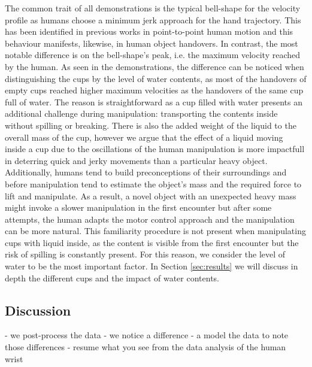 The common trait of all demonstrations is the typical bell-shape for the velocity profile as humans choose a minimum jerk approach for the hand trajectory. This has been identified in previous works in point-to-point human motion \cite{flash} and this behaviour manifests, likewise, in human object handovers. In contrast, the most notable difference is on the bell-shape's peak, i.e. the maximum velocity reached by the human. As seen in the demonstrations, the difference can be noticed when distinguishing the cups by the level of water contents, as most of the handovers of empty cups reached higher maximum velocities as the handovers of the same cup full of water. The reason is straightforward as a cup filled with water presents an additional challenge during manipulation: transporting the contents inside without spilling or breaking. There is also the added weight of the liquid to the overall mass of the cup, however we argue that the effect of a liquid moving inside a cup due to the oscillations of the human manipulation is more impactfull in deterring quick and jerky movements than a particular heavy object. Additionally, humans tend to build preconceptions of their surroundings and before manipulation tend to estimate the object's mass and the required force to lift and manipulate. As a result, a novel object with an unexpected heavy mass might invoke a slower manipulation in the first encounter but after some attempts, the human adapts the motor control approach and the manipulation can be more natural. This familiarity procedure is not present when manipulating cups with liquid inside, as the content is visible from the first encounter but the risk of spilling is constantly present. For this reason, we consider the level of water to be the most important factor. In Section \ref{sec:results} we will discuss in depth the different cups and the impact of water contents. 

\subsection{Discussion}

- we post-process the data
- we notice a difference
- a model the data to note those differences
- resume what you see from the data analysis of the human wrist

